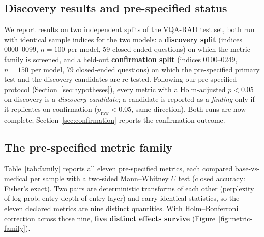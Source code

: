 \subsection{Discovery results and pre-specified status}

We report results on two independent splits of the VQA-RAD test set, both run with
identical sample indices for the two models: a \textbf{discovery split} (indices
0000--0099, $n{=}100$ per model, 59 closed-ended questions) on which the metric family
is screened, and a held-out \textbf{confirmation split} (indices 0100--0249, $n{=}150$
per model, 79 closed-ended questions) on which the pre-specified primary test and the
discovery candidates are re-tested. Following our pre-specified protocol
(Section~\ref{sec:hypotheses}), every metric with a Holm-adjusted $p<0.05$ on discovery
is a \emph{discovery candidate}; a candidate is reported as a \emph{finding} only if it
replicates on confirmation ($p_\text{raw}<0.05$, same direction). Both runs are now
complete; Section~\ref{sec:confirmation} reports the confirmation outcome.

\subsection{The pre-specified metric family}

Table~\ref{tab:family} reports all eleven pre-specified metrics, each compared
base-vs-medical per sample with a two-sided Mann--Whitney $U$ test (closed accuracy:
Fisher's exact). Two pairs are deterministic transforms of each other (perplexity of
log-prob; entry depth of entry layer) and carry identical statistics, so the eleven
declared metrics are nine distinct quantities. With Holm--Bonferroni correction across
those nine, \textbf{five distinct effects survive} (Figure~\ref{fig:metric-family}).

